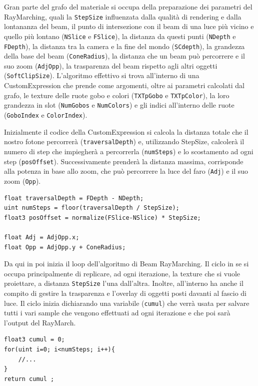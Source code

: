 \documentclass[main.tex]{subfiles}
\begin{document}
\noindent Gran parte del grafo del materiale si occupa della preparazione dei parametri del RayMarching, quali la \lstinline{StepSize} influenzata dalla qualità di rendering e dalla lontananza del beam, il punto di intersezione con il beam di una luce più vicino e quello più lontano (\lstinline{NSlice} e \lstinline{FSlice}), la distanza da questi punti (\lstinline{NDepth} e \lstinline{FDepth}), la distanza tra la camera e la fine del mondo (\lstinline{SCdepth}), la grandezza della base del beam (\lstinline{ConeRadius}), la distanza che un beam può percorrere e il suo zoom (\lstinline{AdjOpp}), la trasparenza del beam rispetto agli altri oggetti (\lstinline{SoftClipSize}). L'algoritmo effettivo si trova all'interno di una CustomExpression che prende come argomenti, oltre ai parametri calcolati dal grafo, le texture delle ruote gobo e colori (\lstinline{TXTpGobo} e \lstinline{TXTpColor}), la loro grandezza in slot (\lstinline{NumGobos} e \lstinline{NumColors}) e gli indici all'interno delle ruote (\lstinline{GoboIndex} e \lstinline{ColorIndex}). \newline

Inizialmente il codice della CustomExpression si calcola la distanza totale che il nostro fotone percorrerà (\lstinline{traversalDepth}) e, utilizzando StepSize, calcolerà il numero di step che impiegherà a percorrerla (\lstinline{numSteps}) e lo scostamento ad ogni step (\lstinline{posOffset}). Successivamente prenderà la distanza massima, corrisponde alla potenza in base allo zoom, che può percorrere la luce del faro (\lstinline{Adj}) e il suo zoom (\lstinline{Opp}).
\lstset{language=glsl}
\begin{lstlisting}
float traversalDepth = FDepth - NDepth;
uint numSteps = floor(traversalDepth / StepSize);
float3 posOffset = normalize(FSlice-NSlice) * StepSize;

float Adj = AdjOpp.x;
float Opp = AdjOpp.y + ConeRadius;
\end{lstlisting}

Da qui in poi inizia il loop dell'algoritmo di Beam RayMarching. Il ciclo in se si occupa principalmente di replicare, ad ogni iterazione, la texture che si vuole proiettare, a distanza \lstinline{StepSize} l'una dall'altra. Inoltre, all'interno ha anche il compito di gestire la trasparenza e l'overlay di oggetti posti davanti al fascio di luce. Il ciclo inizia dichiarando una variabile (\lstinline{cumul}) che verrà usata per salvare tutti i vari sample che vengono effettuati ad ogni iterazione e che poi sarà l'output del RayMarch.
\begin{lstlisting}
float3 cumul = 0;
for(uint i=0; i<numSteps; i++){
    //...
}
return cumul ;
\end{lstlisting}
\end{document}
